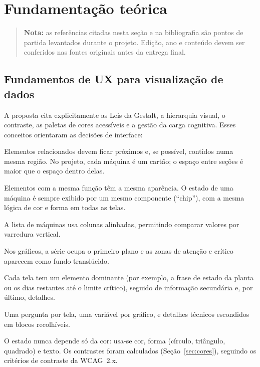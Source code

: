 \documentclass[12pt,a4paper]{article}
\begin{document}
\section{Fundamentação teórica}
\label{sec:fundamentacao}
\begin{quote}\small
\textbf{Nota:} as referências citadas nesta seção e na bibliografia são pontos de partida levantados durante o projeto. Edição, ano e conteúdo
devem ser conferidos nas fontes originais antes da entrega final.
\end{quote}

\subsection{Fundamentos de UX para visualização de dados}
A proposta cita explicitamente as Leis da Gestalt, a hierarquia visual, o contraste, as paletas de cores acessíveis e a gestão da carga cognitiva.
Esses conceitos orientaram as decisões de interface:

\begin{description}[leftmargin=0.5cm,style=nextline]
  \item[Proximidade e região comum.] Elementos relacionados devem ficar próximos e, se possível, contidos numa mesma região. No projeto, cada máquina
  é um cartão; o espaço entre seções é maior que o espaço dentro delas.
  \item[Similaridade.] Elementos com a mesma função têm a mesma aparência. O estado de uma máquina é sempre exibido por um mesmo componente (``chip''),
  com a mesma lógica de cor e forma em todas as telas.
  \item[Continuidade e alinhamento.] A lista de máquinas usa colunas alinhadas, permitindo comparar valores por varredura vertical.
  \item[Figura-fundo.] Nos gráficos, a série ocupa o primeiro plano e as zonas de atenção e crítico aparecem como fundo translúcido.
  \item[Hierarquia visual.] Cada tela tem um elemento dominante (por exemplo, a frase de estado da planta ou os dias restantes até o limite crítico),
  seguido de informação secundária e, por último, detalhes.
  \item[Carga cognitiva e revelação progressiva.] Uma pergunta por tela, uma variável por gráfico, e detalhes técnicos escondidos em blocos recolhíveis.
  \item[Cor acessível.] O estado nunca depende só da cor: usa-se cor, forma (círculo, triângulo, quadrado) e texto. Os contrastes foram calculados
  (Seção~\ref{sec:cores}), seguindo os critérios de contraste da WCAG~2.x.
\end{description}
\end{document}
